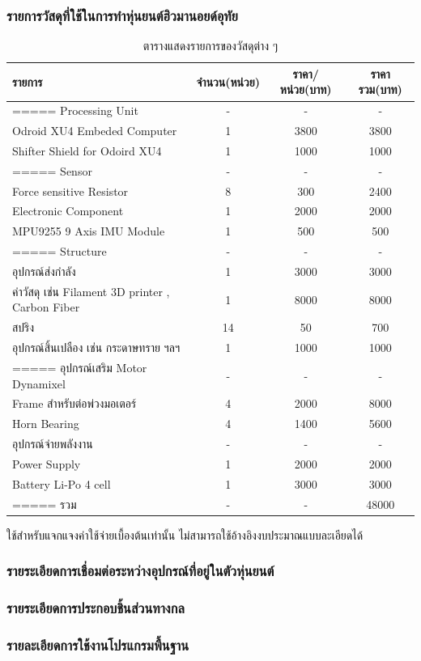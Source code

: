 \subsubsection{รายการวัสดุที่ใช้ในการทำหุ่นยนต์ฮิวมานอยด์อุทัย}
\begin{table}[ht]
	\centering
	\begin{tabular}{| l | c | c | c|}
		\hline
		รายการ & จำนวน(หน่วย) & ราคา/หน่วย(บาท) & ราคารวม(บาท) \\
		\hline
		===== Processing Unit & - & - & -\\
		Odroid XU4 Embeded Computer & 1 & 3800 & 3800\\
		Shifter Shield for Odoird XU4 & 1 & 1000 & 1000\\
		===== Sensor & - & - & -\\
		Force sensitive Resistor & 8 & 300 & 2400\\
		Electronic Component & 1 & 2000 & 2000\\
		MPU9255 9 Axis IMU Module & 1 & 500 & 500\\
		===== Structure & - & - & -\\
		อุปกรณ์ส่งกำลัง & 1 & 3000 & 3000\\
		ค่าวัสดุ เช่น Filament 3D printer , Carbon Fiber & 1 & 8000 & 8000\\
		สปริง & 14 & 50 & 700\\
		อุปกรณ์สิ้นเปลือง เช่น กระดาษทราย ฯลฯ & 1 & 1000 & 1000\\
		===== อุปกรณ์เสริม Motor Dynamixel & - & - & -\\
		Frame สำหรับต่อพ่วงมอเตอร์ & 4 & 2000 & 8000\\
		Horn Bearing & 4 & 1400 & 5600\\
		อุปกรณ์จ่ายพลังงาน & - & - & -\\
		Power Supply & 1 & 2000 & 2000\\
		Battery Li-Po 4 cell & 1 & 3000 & 3000\\
		===== รวม & - & - & 48000\\
		\hline
	\end{tabular}
	\caption{ตารางแสดงรายการของวัสดุต่าง ๆ}
	\label{tab:matrial_buyer}
\end{table}
ใช้สำหรับแจกแจงค่าใช้จ่ายเบื้องต้นเท่านั้น ไม่สามารถใช้อ้างอิงงบประมาณแบบละเอียดได้

\subsubsection{รายระเอียดการเชื่อมต่อระหว่างอุปกรณ์ที่อยู่ในตัวหุ่นยนต์}
\subsubsection{รายระเอียดการประกอบชิ้นส่วนทางกล}
\subsubsection{รายละเอียดการใช้งานโปรแกรมพื้นฐาน}